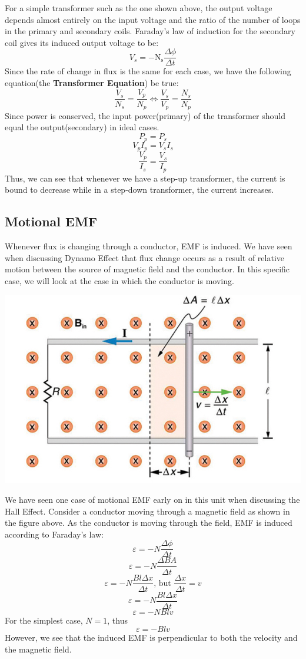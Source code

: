 \documentclass[9pt]{article}
\begin{document}
	For a simple transformer such as the one shown above, the output voltage depends almost entirely on the input voltage and the ratio of the number of loops in the primary and secondary coils. Faraday’s law of induction for the secondary coil gives its induced output voltage to be:
	$$V_s=-\text{N}_\text{s}\dfrac{\Delta\phi}{\Delta t}$$
	Since the rate of change in flux is the same for each case, we have the following equation(the \textbf{Transformer Equation}) be true:
	$$\dfrac{V_s}{N_s}=\dfrac{V_p}{N_p}\iff\dfrac{V_s}{V_p}=\dfrac{N_s}{N_p}$$
	Since power is conserved, the input power(primary) of the transformer should equal the output(secondary) in ideal cases.
	$$P_{p}=P_{s}$$
	$$V_pI_p=V_sI_s$$
	$$\dfrac{V_p}{I_s}=\dfrac{V_s}{I_p}$$
	Thus, we can see that whenever we have a step-up transformer, the current is bound to decrease while in a step-down transformer, the current increases.
	\subsection*{Motional EMF}
	Whenever flux is changing through a conductor, EMF is induced. We have seen when discussing Dynamo Effect that flux change occurs as a result of relative motion between the source of magnetic field and the conductor. In this specific case, we will look at the case in which the conductor is moving.
	\begin{center}
		\includegraphics[scale=0.5]{motional_EMF}
	\end{center}
	We have seen one case of motional EMF early on in this unit when discussing the Hall Effect. Consider a conductor moving through a magnetic field as shown in the figure above. As the conductor is moving through the field, EMF is induced according to Faraday's law:
	$$\varepsilon=-N\dfrac{\Delta\phi}{\varDelta t}$$
	$$\varepsilon=-N\dfrac{\Delta BA}{\varDelta t}$$
	$$\varepsilon=-N\dfrac{ Bl\Delta x}{\Delta t}\text{, but }\dfrac{\Delta x}{\Delta t}=v$$
	$$\varepsilon=-N\dfrac{ Bl\Delta x}{\Delta t}$$
	$$\varepsilon=-NBlv$$
	For the simplest case, $N=1$, thus
	$$\varepsilon=-Blv$$
	However, we see that the induced EMF is perpendicular to both the velocity and the magnetic field.
\end{document}
